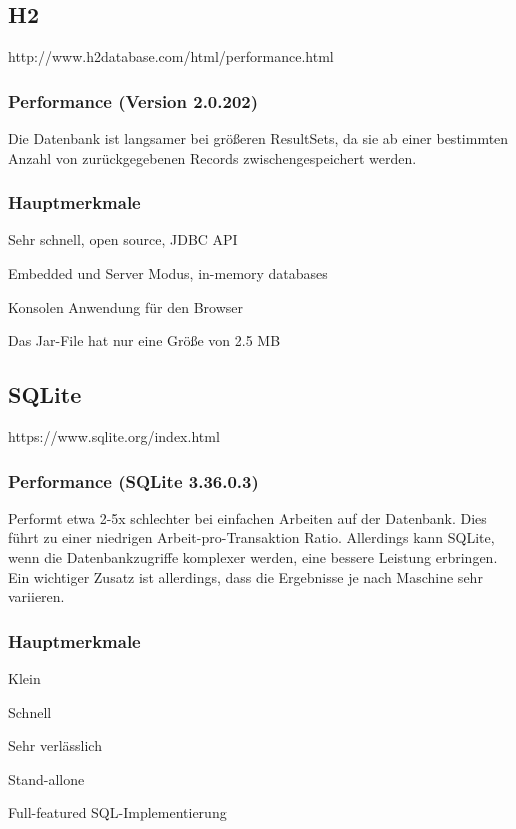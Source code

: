 \subsection{H2}
http://www.h2database.com/html/performance.html

\subsubsection{Performance (Version 2.0.202)}
Die Datenbank ist langsamer bei größeren ResultSets, da sie ab einer bestimmten Anzahl von zurückgegebenen Records zwischengespeichert werden.

\subsubsection{Hauptmerkmale}

\begin{compactitem}
    \item Sehr schnell, open source, JDBC API 
    \item Embedded und Server Modus, in-memory databases         
    \item Konsolen Anwendung für den Browser
    \item Das Jar-File hat nur eine Größe von 2.5 MB
\end{compactitem}

\subsection{SQLite}
https://www.sqlite.org/index.html 

\subsubsection{Performance (SQLite 3.36.0.3)}
Performt etwa 2-5x schlechter bei einfachen Arbeiten auf der Datenbank. Dies führt zu einer niedrigen Arbeit-pro-Transaktion Ratio. Allerdings kann SQLite, wenn die Datenbankzugriffe komplexer werden, eine bessere Leistung erbringen. Ein wichtiger Zusatz ist allerdings, dass die Ergebnisse je nach Maschine sehr variieren. 

\subsubsection{Hauptmerkmale}

\begin{compactitem}
    \item Klein
    \item Schnell         
    \item Sehr verlässlich
    \item Stand-allone
    \item Full-featured SQL-Implementierung
\end{compactitem}

